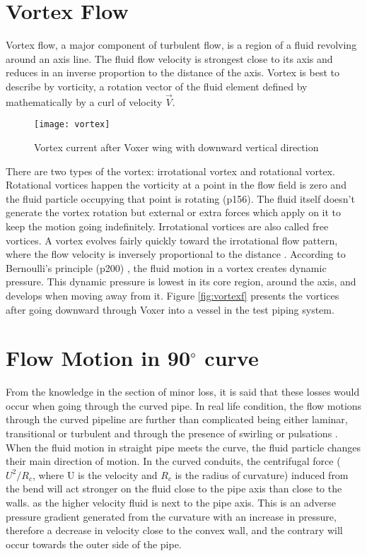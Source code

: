 \section{Vortex Flow}
Vortex flow, a major component of turbulent flow, is a region of a fluid revolving around an axis line. The fluid flow velocity is strongest close to its axis and reduces in an inverse proportion to the distance of the axis. 
Vortex is best to describe by vorticity, a rotation vector of the fluid element defined by mathematically by a curl of velocity $\vec{V}$. 
\begin{wrapfigure}{r}{0.5\textwidth}
  \begin{center}
  \texttt{[image: vortex]}
   \end{center}
  \caption{Vortex current after Voxer wing with downward vertical direction}
  \label{fig:vortexf}
\end{wrapfigure}
There are two types of the vortex: irrotational vortex and rotational vortex. Rotational vortices happen the vorticity at a point in the flow field is zero and the fluid particle occupying that point is rotating (p156)\cite{cengel:book}. The fluid itself doesn't generate the vortex rotation but external or extra forces which apply on it to keep the motion going indefinitely. 
Irrotational vortices are also called free vortices. A vortex evolves fairly quickly toward the irrotational flow pattern, where the flow velocity is inversely proportional to the distance \cite{wiki:web}.
According to Bernoulli's principle (p200) \cite{cengel:book}, the fluid motion in a vortex creates dynamic pressure. This dynamic pressure is lowest in its core region, around the axis, and develops when moving away from it. Figure \vref{fig:vortexf} presents the vortices after going downward through Voxer into a vessel in the test piping system. 


\section{Flow Motion in 90$^{\circ}$ curve}
From the knowledge in the section of minor loss, it is said that these losses would occur when going through the curved pipe. In real life condition, the flow motions through the curved pipeline are further than complicated being either laminar, transitional or turbulent and through the presence of swirling or pulsations \cite{curve:article}.  When the fluid motion in straight pipe meets the curve, the fluid particle changes their main direction of motion. In the curved conduits, the centrifugal force ($U^{2} / R_{c}$, where U is the velocity and $R_{c}$ is the radius of curvature) induced from the bend will act stronger on the fluid close to the pipe axis than close to the walls. as the higher velocity fluid is next to the pipe axis. This is an adverse pressure gradient generated from the curvature with an increase in pressure, therefore a decrease in velocity close to the convex wall, and the contrary will occur towards the outer side of the pipe. 

\clearpage %
